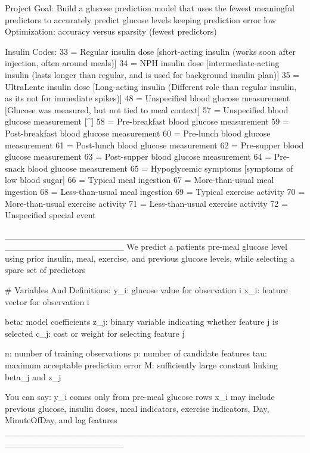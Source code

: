 Project Goal:
Build a glucose prediction model that uses the fewest meaningful predictors to accurately predict glucose levels keeping prediction error low
Optimization: accuracy versus sparsity (fewest predictors)


Insulin Codes: 
33 = Regular insulin dose                               [short-acting insulin (works soon after injection, often around meals)]
34 = NPH insulin dose                                   [intermediate-acting insulin (lasts longer than regular, and is used for background insulin plan)]
35 = UltraLente insulin dose                            [Long-acting insulin (Different role than regular insulin, as its not for immediate spikes)]
48 = Unspecified blood glucose measurement              [Glucose was measured, but not tied to meal context]
57 = Unspecified blood glucose measurement              [^]
58 = Pre-breakfast blood glucose measurement
59 = Post-breakfast blood glucose measurement
60 = Pre-lunch blood glucose measurement
61 = Post-lunch blood glucose measurement
62 = Pre-supper blood glucose measurement
63 = Post-supper blood glucose measurement
64 = Pre-snack blood glucose measurement
65 = Hypoglycemic symptoms                              [symptoms of low blood sugar]
66 = Typical meal ingestion
67 = More-than-usual meal ingestion
68 = Less-than-usual meal ingestion
69 = Typical exercise activity
70 = More-than-usual exercise activity
71 = Less-than-usual exercise activity
72 = Unspecified special event

___________________________________________________________________
We predict a patients pre-meal glucose level using prior insulin, meal, exercise, and previous glucose levels, while selecting a spare set of predictors

# Variables And Definitions:
y_i: glucose value for observation i
x_i: feature vector for observation i

beta: model coefficients
z_j: binary variable indicating whether feature j is selected
c_j: cost or weight for selecting feature j

n: number of training observations
p: number of candidate features
tau: maximum acceptable prediction error
M: sufficiently large constant linking beta_j and z_j

You can say:
y_i comes only from pre-meal glucose rows
x_i may include previous glucose, insulin doses, meal indicators, exercise indicators, Day, MinuteOfDay, and lag features
___________________________________________________________________

